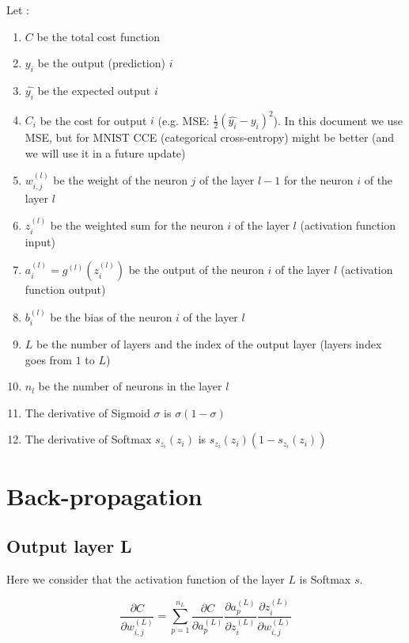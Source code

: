 \documentclass[11pt,a4paper]{report}
\begin{document}
Let :
\begin{enumerate}
    \item $C$ be the total cost function
    \item $y_i$ be the output (prediction) $i$
    \item $\hat{y_i}$ be the expected output $i$
    \item $C_i$ be the cost for output $i$ (e.g. MSE: $\frac{1}{2}\left(\hat{y_i}-y_i\right)^2$). In this document we use MSE, but for MNIST CCE (categorical cross-entropy) might be better (and we will use it in a future update)
    \item $w_{i,j}^{(l)}$ be the weight of the neuron $j$ of the layer $l-1$ for the neuron $i$ of the layer $l$
    \item $z_i^{(l)}$ be the weighted sum for the neuron $i$ of the layer $l$ (activation function input)
    \item $a_i^{(l)} = g^{(l)}(z_i^{(l)})$ be the output of the neuron $i$ of the layer $l$ (activation function output)
    \item $b_i^{(l)}$ be the bias of the neuron $i$ of the layer $l$
    \item $L$ be the number of layers and the index of the output layer (layers index goes from $1$ to $L$)
    \item $n_l$ be the number of neurons in the layer $l$
    \item The derivative of Sigmoid $\sigma$ is $\sigma (1-\sigma)$
    \item The derivative of Softmax $s_{z_i}(z_i)$ is $s_{z_i}(z_i)\left( 1 - s_{z_i}(z_i)\right)$
\end{enumerate}

\newpage
\section{Back-propagation}

\subsection{Output layer L}

Here we consider that the activation function of the layer $L$ is Softmax $s$.


\begin{equation*}
    \frac{\partial C}{\partial w_{i,j}^{(L)}} = \sum\limits_{p=1}^{n_{L}}\frac{\partial C}{\partial a_p^{(L)}} \frac{\partial a_p^{(L)}}{\partial z_i^{(L)}} \frac{\partial z_i^{(L)}}{\partial w_{i,j}^{(L)}}
\end{equation*}
\end{document}
